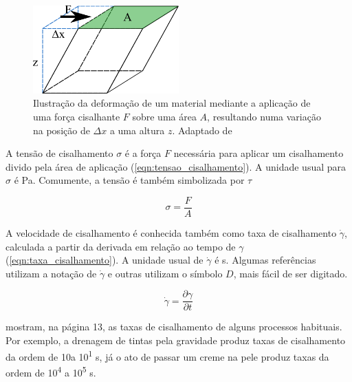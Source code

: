			\begin{figure}[h]
				\centering
				\includegraphics[width=0.5\textwidth]{imagens/reologia/cisalhamento}
				\caption{Ilustração da deformação de um material mediante a aplicação de uma força cisalhante \(F\) sobre uma área \(A\), resultando numa variação na posição de \(\Delta x\) a uma altura \(z\). Adaptado de \citeauthor{Barnes_introduction_rheology}
				}
				\label{fig:cisalhamento}
			\end{figure} 
			
			A tensão de cisalhamento \(\sigma\) é a força \(F\) necessária para aplicar um cisalhamento divido pela área de aplicação (\autoref{eqn:tensao_cisalhamento})\cite{Kronberg2014a}. A unidade usual para \(\sigma\) é Pa. Comumente, a tensão é também simbolizada por \(\tau\) 
			
			\begin{equation}
				\sigma = \frac{F}{A}
				\label{eqn:tensao_cisalhamento}
			\end{equation}
			
			A velocidade de cisalhamento é conhecida também como taxa de cisalhamento \(\dot{\gamma}\), calculada a partir da derivada em relação ao tempo de \(\gamma\) (\autoref{eqn:taxa_cisalhamento})\cite{Kronberg2014a}. A unidade usual de \(\dot{\gamma}\) é s\menosUm.  Algumas referências utilizam a notação de \(\dot{\gamma}\) e outras utilizam o símbolo \(D\), mais fácil de ser digitado.\cite{Schramm1994}
			
			\begin{equation}
				\dot{\gamma} = \dfrac{\partial \gamma}{\partial t}
				\label{eqn:taxa_cisalhamento}
			\end{equation}
			
			\citeauthor{Barnes_introduction_rheology} mostram, na página 13, as taxas de cisalhamento de alguns processos habituais. Por exemplo, a drenagem de tintas pela gravidade produz taxas de cisalhamento da ordem de 10\menosUm a 10\textsuperscript{1} s\menosUm, já o ato de passar um creme na pele produz taxas da ordem de 10\textsuperscript{4} a 10\textsuperscript{5} s\menosUm.
						

